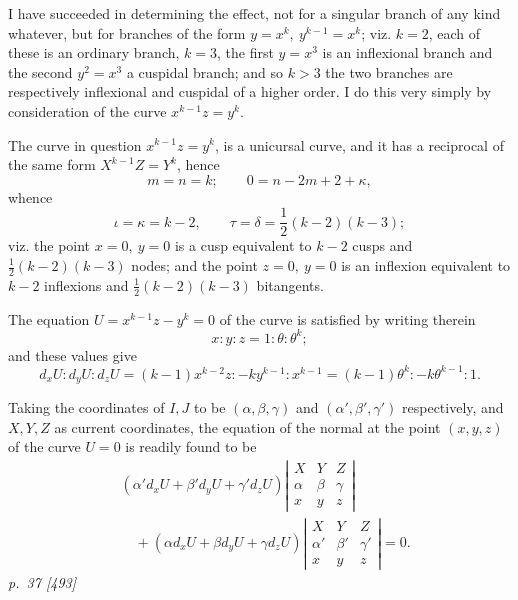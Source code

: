 ﻿\documentclass[11pt,a4paper]{article}
\theoremstyle{plain}
\theoremstyle{definition}
\newcommand{\detthree}[9]{%
  \left|\begin{array}{ccc}
  #1 & #2 & #3\\
  #4 & #5 & #6\\
  #7 & #8 & #9
  \end{array}\right|}
\begin{document}
I have succeeded in determining the effect, not for a singular branch of
any kind whatever, but for branches of the form \(y=x^k,\ y^{k-1}=x^k\);
viz. \(k=2\), each of these is an ordinary branch, \(k=3\), the first
\(y=x^3\) is an inflexional branch and the second \(y^2=x^3\) a cuspidal
branch; and so \(k>3\) the two branches are respectively inflexional and
cuspidal of a higher order. I do this very simply by consideration of the
curve \(x^{k-1}z=y^k\).

The curve in question \(x^{k-1}z=y^k\), is a unicursal curve, and it has a
reciprocal of the same form \(X^{k-1}Z=Y^k\), hence
\[
m=n=k;\qquad 0=n-2m+2+\kappa,
\]
whence
\[
\iota=\kappa=k-2,\qquad
\tau=\delta=\frac12(k-2)(k-3);
\]
viz. the point \(x=0,\ y=0\) is a cusp equivalent to \(k-2\) cusps and
\(\frac12(k-2)(k-3)\) nodes; and the point \(z=0,\ y=0\) is an inflexion
equivalent to \(k-2\) inflexions and
\(\frac12(k-2)(k-3)\) bitangents.

The equation \(U=x^{k-1}z-y^k=0\) of the curve is satisfied by writing
therein
\[
x:y:z=1:\theta:\theta^k;
\]
and these values give
\[
d_xU:d_yU:d_zU=(k-1)x^{k-2}z:-ky^{k-1}:x^{k-1}
=(k-1)\theta^k:-k\theta^{k-1}:1.
\]

Taking the coordinates of \(I,J\) to be \((\alpha,\beta,\gamma)\) and
\((\alpha',\beta',\gamma')\) respectively, and \(X,Y,Z\) as current
coordinates, the equation of the normal at the point \((x,y,z)\) of the
curve \(U=0\) is readily found to be
\[
\begin{aligned}
&(\alpha'd_xU+\beta'd_yU+\gamma'd_zU)
\detthree{X}{Y}{Z}{\alpha}{\beta}{\gamma}{x}{y}{z}\\
&\quad+
(\alpha d_xU+\beta d_yU+\gamma d_zU)
\detthree{X}{Y}{Z}{\alpha'}{\beta'}{\gamma'}{x}{y}{z}=0.
\end{aligned}
\]
\textit{p.~37 [493]}
\end{document}
